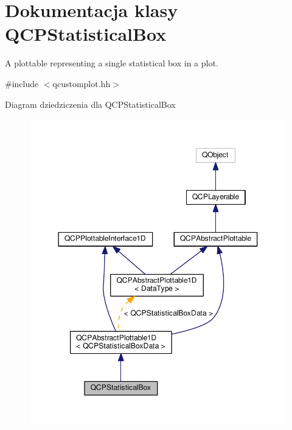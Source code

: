 \hypertarget{class_q_c_p_statistical_box}{}\section{Dokumentacja klasy Q\+C\+P\+Statistical\+Box}
\label{class_q_c_p_statistical_box}


A plottable representing a single statistical box in a plot.  




{\ttfamily \#include $<$qcustomplot.\+hh$>$}



Diagram dziedziczenia dla Q\+C\+P\+Statistical\+Box\nopagebreak
\begin{figure}[H]
\begin{center}
\leavevmode
\includegraphics[width=350pt]{class_q_c_p_statistical_box__inherit__graph}
\end{center}
\end{figure}


